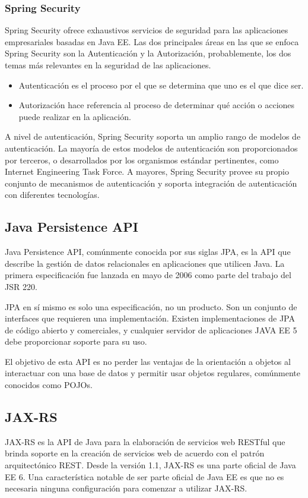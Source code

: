 \subsubsection*{Spring Security}
Spring Security ofrece exhaustivos servicios de seguridad para las aplicaciones empresariales basadas en Java EE. 
Las dos principales áreas en las que se enfoca Spring Security son la Autenticación y la Autorización, probablemente, los dos temas más relevantes en la seguridad de las aplicaciones.
	\begin{itemize}
		\item Autenticación es el proceso por el que se determina que uno es el que dice ser.
		\item Autorización hace referencia al proceso de determinar qué acción o acciones puede realizar en la aplicación.
	\end{itemize}
	
A nivel de autenticación, Spring Security soporta un amplio rango de modelos de autenticación. La mayoría de estos modelos de autenticación son proporcionados por terceros, o desarrollados por los organismos estándar pertinentes, como Internet Engineering Task Force. A mayores, Spring Security provee su propio conjunto de mecanismos de autenticación y soporta integración de autenticación con diferentes tecnologías.


\subsection{Java Persistence API}
Java Persistence API, comúnmente conocida por sus siglas JPA, es la API que describe la gestión de datos relacionales en aplicaciones que utilicen Java. La primera especificación fue lanzada en mayo de 2006 como parte del trabajo del JSR 220.

JPA en sí mismo es solo una especificación, no un producto. Son un conjunto de interfaces que requieren una implementación. Existen implementaciones de JPA de código abierto y comerciales, y cualquier servidor de aplicaciones JAVA EE 5 debe proporcionar soporte para su uso.

El objetivo de esta API es no perder las ventajas de la orientación a objetos al interactuar con una base de datos y permitir usar objetos regulares, comúnmente conocidos como POJOs. 

\subsection{JAX-RS}
JAX-RS es la API de Java para la elaboración de servicios web RESTful que brinda soporte en la creación de servicios web de acuerdo con el patrón arquitectónico REST. Desde la versión 1.1, JAX-RS es una parte oficial de Java EE 6. Una característica notable de ser parte oficial de Java EE es que no es necesaria ninguna configuración para comenzar a utilizar JAX-RS.

